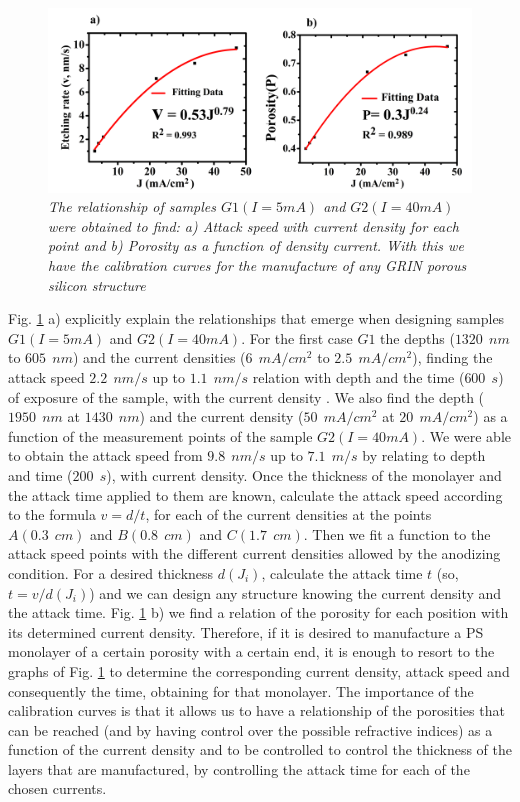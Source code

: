 \documentclass{article}
\begin{document}
\begin{figure}
  \centering
  \includegraphics[scale=.6]{Images/grinJD31}
  \caption{\emph{The relationship of samples $ G1 (I = 5 mA) $ and $
      G2 (I = 40 mA) $ were obtained to find: a) Attack speed with
      current density for each point and b) Porosity as a function of
      density current. With this we have the calibration curves for
      the manufacture of any GRIN porous silicon structure   } }
  \label{fig:Indr1}
\end{figure}
Fig. \ref{fig:Indr1} a) explicitly explain the relationships that
emerge when designing samples $ G1 (I = 5 mA) $ and $ G2 (I = 40 mA)
$. For the first case $ G1 $ the depths ($ 1320 \ \ nm $ to $ 605 \ \
nm $) and the current densities ($ 6 \ \ mA / cm ^ 2 $ to $ 2.5 \ \ mA
/ cm ^ 2 $), finding the attack speed $ 2.2 \ \ nm / s $ up to $ 1.1 \
\ nm / s $ relation with depth and the time ($ 600 \ \ s $) of
exposure of the sample, with the current density . We also find the
depth ($ 1950 \ \ nm $ at $ 1430 \ \ nm $) and the current density ($
50 \ \ mA / cm ^ 2 $ at $ 20 \ \ mA / cm ^ 2 $) as a function of the
measurement points of the sample $ G2 (I = 40 mA) $. We were able to
obtain the attack speed from $ 9.8 \ \ nm / s $ up to $ 7.1 \ \ m / s
$ by relating to depth and time ($ 200 \ \ s $), with current
density. Once the thickness of the monolayer and the attack time
applied to them are known, calculate the attack speed according to the
formula $ v = d / t $, for each of the current densities at the points
$ A ( 0.3 \ \ cm) $ and $ B (0.8 \ \ cm) $ and $ C (1.7 \ \ cm)
$. Then we fit a function to the attack speed points with the
different current densities allowed by the anodizing condition. For a
desired thickness $ d (J_i) $, calculate the attack time $ t $ (so, $
t = v / d (J_i) $) and we can design any structure knowing the current
density and the attack time. Fig. \ref{fig:Indr1} b) we find a
relation of the porosity for each position with its determined current
density. Therefore, if it is desired to manufacture a PS monolayer of
a certain porosity with a certain end, it is enough to resort to the
graphs of Fig. \ref{fig:Indr1} to determine the corresponding current
density, attack speed and consequently the time, obtaining for that
monolayer. The importance of the calibration curves is that it allows
us to have a relationship of the porosities that can be reached (and
by having control over the possible refractive indices) as a function
of the current density and to be controlled to control the thickness
of the layers that are manufactured, by controlling the attack time
for each of the chosen currents.
\end{document}

